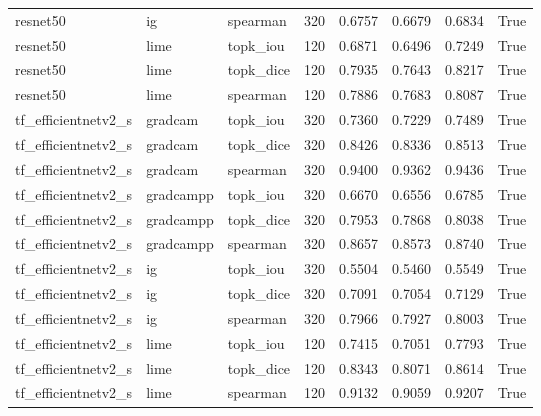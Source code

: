 \begin{tabular}{lllrrrrr}
resnet50 & ig & spearman & 320 & 0.6757 & 0.6679 & 0.6834 & True \\
resnet50 & lime & topk\_iou & 120 & 0.6871 & 0.6496 & 0.7249 & True \\
resnet50 & lime & topk\_dice & 120 & 0.7935 & 0.7643 & 0.8217 & True \\
resnet50 & lime & spearman & 120 & 0.7886 & 0.7683 & 0.8087 & True \\
tf\_efficientnetv2\_s & gradcam & topk\_iou & 320 & 0.7360 & 0.7229 & 0.7489 & True \\
tf\_efficientnetv2\_s & gradcam & topk\_dice & 320 & 0.8426 & 0.8336 & 0.8513 & True \\
tf\_efficientnetv2\_s & gradcam & spearman & 320 & 0.9400 & 0.9362 & 0.9436 & True \\
tf\_efficientnetv2\_s & gradcampp & topk\_iou & 320 & 0.6670 & 0.6556 & 0.6785 & True \\
tf\_efficientnetv2\_s & gradcampp & topk\_dice & 320 & 0.7953 & 0.7868 & 0.8038 & True \\
tf\_efficientnetv2\_s & gradcampp & spearman & 320 & 0.8657 & 0.8573 & 0.8740 & True \\
tf\_efficientnetv2\_s & ig & topk\_iou & 320 & 0.5504 & 0.5460 & 0.5549 & True \\
tf\_efficientnetv2\_s & ig & topk\_dice & 320 & 0.7091 & 0.7054 & 0.7129 & True \\
tf\_efficientnetv2\_s & ig & spearman & 320 & 0.7966 & 0.7927 & 0.8003 & True \\
tf\_efficientnetv2\_s & lime & topk\_iou & 120 & 0.7415 & 0.7051 & 0.7793 & True \\
tf\_efficientnetv2\_s & lime & topk\_dice & 120 & 0.8343 & 0.8071 & 0.8614 & True \\
tf\_efficientnetv2\_s & lime & spearman & 120 & 0.9132 & 0.9059 & 0.9207 & True \\
\bottomrule
\end{tabular}
